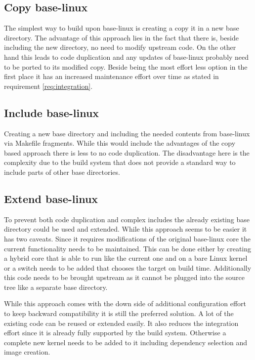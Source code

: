 \documentclass[
a4paper,
11pt,
twoside
]{report}
\begin{document}
		\subsection{Copy base-linux}
		The simplest way to build upon base-linux is creating a copy it in a new base directory.
		The advantage of this approach lies in the fact that there is, beside including the new directory, no need to modify upstream code.
		On the other hand this leads to code duplication and any updates of base-linux probably need to be ported to its modified copy.
		Beside being the most effort less option in the first place it has an increased maintenance effort over time as stated in requirement \ref{req:integration}.
		
		\subsection{Include base-linux}
		Creating a new base directory and including the needed contents from base-linux via Makefile fragments.
		While this would include the advantages of the copy based approach there is less to no code duplication.
		The disadvantage here is the complexity due to the build system that does not provide a standard way to include parts of other base directories.
		
		\subsection{Extend base-linux}
		To prevent both code duplication and complex includes the already existing base directory could be used and extended.
		While this approach seems to be easier it has two caveats.
		Since it requires modifications of the original base-linux core the current functionality needs to be maintained.
		This can be done either by creating a hybrid core that is able to run like the current one and on a bare Linux kernel or a switch needs to be added that chooses the target on build time.
		Additionally this code needs to be brought upstream as it cannot be plugged into the source tree like a separate base directory.
		
		While this approach comes with the down side of additional configuration effort to keep backward compatibility it is still the preferred solution.
		A lot of the existing code can be reused or extended easily.
		It also reduces the integration effort since it is already fully supported by the build system.
		Otherwise a complete new kernel needs to be added to it including dependency selection and image creation.
	
\end{document}
